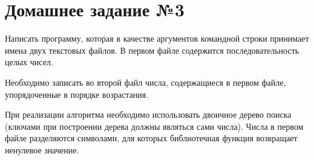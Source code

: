 \section*{Домашнее задание №3}


Написать программу, которая в качестве аргументов командной строки
принимает имена двух текстовых файлов. В первом файле содержится
последовательность целых чисел.

Необходимо записать во второй файл
числа, содержащиеся в первом файле, упорядоченные в порядке
возрастания.

При реализации алгоритма необходимо использовать
двоичное дерево поиска (ключами при построении дерева должны
являться сами числа). Числа в первом файле разделяются символами, для
которых библиотечная функция  возвращает ненулевое значение.
